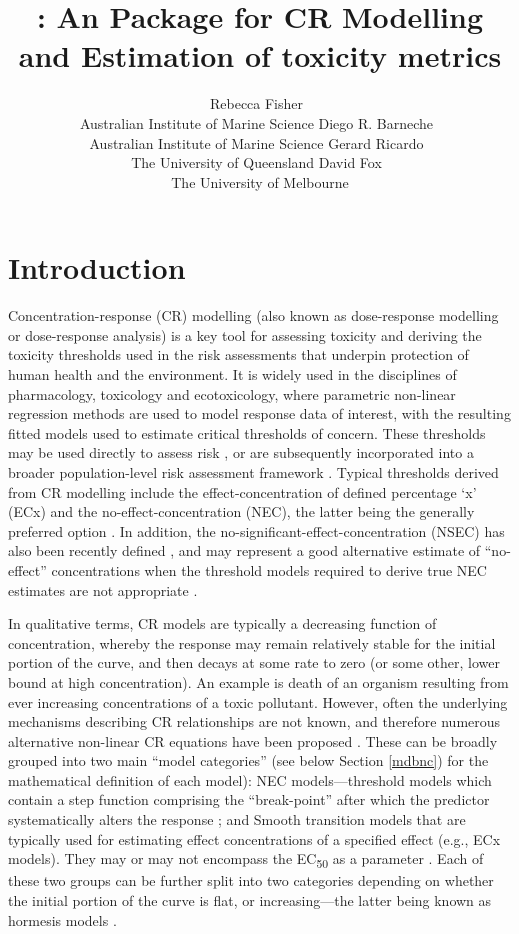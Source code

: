 \documentclass[
  shortnames]{jss}
\author{
Rebecca Fisher~\orcidlink{0000-0001-5148-6731}\\Australian Institute of Marine Science \And Diego R. Barneche~\orcidlink{0000-0002-4568-2362}\\Australian Institute of Marine Science \And Gerard Ricardo~\orcidlink{0000-0002-7761-0806}\\The University of Queensland \And David Fox~\orcidlink{0000-0002-3178-7243}\\The University of Melbourne
}
\title{\pkg{bayesnec}: An \proglang{R} Package for CR Modelling and Estimation of toxicity metrics}
\begin{document}
\hypertarget{introduction}{%
\section{Introduction}\label{introduction}}

Concentration-response (CR) modelling (also known as dose-response modelling or dose-response analysis) is a key tool for assessing toxicity and deriving the toxicity thresholds used in the risk assessments that underpin protection of human health and the environment. It is widely used in the disciplines of pharmacology, toxicology and ecotoxicology, where parametric non-linear regression methods are used to model response data of interest, with the resulting fitted models used to estimate critical thresholds of concern. These thresholds may be used directly to assess risk \citep[e.g., see][]{fisher2018c}, or are subsequently incorporated into a broader population-level risk assessment framework \citep[e.g.,][]{Warne2015}. Typical thresholds derived from CR modelling include the effect-concentration of defined percentage `x' (ECx) and the no-effect-concentration (NEC), the latter being the generally preferred option \citep{Fox2008, Warne2015, Warne2018c}. In addition, the no-significant-effect-concentration (NSEC) has also been recently defined \citep{Fisher2023}, and may represent a good alternative estimate of ``no-effect'' concentrations when the threshold models required to derive true NEC estimates are not appropriate \citep{Fisher2023, fisher2023ieam}.

In qualitative terms, CR models are typically a decreasing function of concentration, whereby the response may remain relatively stable for the initial portion of the curve, and then decays at some rate to zero (or some other, lower bound at high concentration). An example is death of an organism resulting from ever increasing concentrations of a toxic pollutant. However, often the underlying mechanisms describing CR relationships are not known, and therefore numerous alternative non-linear CR equations have been proposed \citep[e.g., models in ,][]{Ritz2016}. These can be broadly grouped into two main ``model categories'' (see below Section \ref{mdbnc}) for the mathematical definition of each model): NEC models---threshold models which contain a step function comprising the ``break-point'' after which the predictor systematically alters the response \citep{Fox2010}; and Smooth transition models that are typically used for estimating effect concentrations of a specified effect (e.g., ECx models). They may or may not encompass the EC\textsubscript{50} as a parameter \citep{Ritz2016}. Each of these two groups can be further split into two categories depending on whether the initial portion of the curve is flat, or increasing---the latter being known as hormesis models \citep{Ritz2016}.
\end{document}
